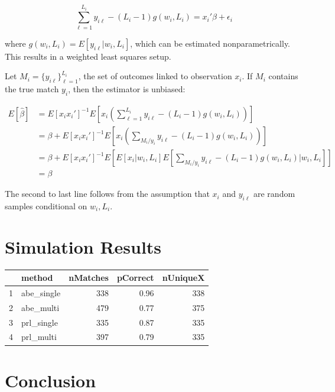 \documentclass[12pt]{article}
\begin{document}
\begin{equation} 
\sum_{\ell=1}^{L_i} y_{i\ell} - (L_i - 1)g(w_i, L_i) = x_i'\beta + \epsilon_i \end{equation}

\noindent where $g(w_i, L_i) = E[y_{i\ell} | w_i, L_i ]$, which can be estimated nonparametrically.   This results in a weighted least squares setup.  

Let $M_i = \{y_{i\ell}\}_{\ell=1}^{L_i}$, the set of outcomes linked to observation $x_i$.  If $M_i$ contains the true match $y_i$,  then the estimator is unbiased:  

\begin{align*} E[\hat{\beta}] &= E[x_ix_i']^{-1}E\left[x_i\left( \sum_{\ell = 1}^{L_i} y_{i\ell}- (L_i-1)g(w_i,L_i) \right) \right] \\
&=\beta + E[x_ix_i']^{-1} E\left[ x_i \left(\sum_{M_i / y_i} y_{i\ell} - (L_i -1) g(w_i, L_i)\right)\right] \\ 
&= \beta +  E[x_ix_i']^{-1} E\left[ E[x_i |w_i, L_i] E\left[\sum_{M_i / y_i} y_{i\ell} - (L_i -1) g(w_i, L_i) | w_i, L_i \right] \right]  \\
&= \beta \end{align*} 

The second to last line follows from the assumption that $x_i$ and $y_{i\ell}$ are random samples conditional on $w_i, L_i$.  

\section{Simulation Results}

\begin{table}[ht]
\centering
\begin{tabular}{rlrrr}
  \hline
 & method & nMatches & pCorrect & nUniqueX \\ 
  \hline
1 & abe\_single & 338 & 0.96 & 338 \\ 
  2 & abe\_multi & 479 & 0.77 & 375 \\ 
  3 & prl\_single & 335 & 0.87 & 335 \\ 
  4 & prl\_multi & 397 & 0.79 & 335 \\ 
   \hline
\end{tabular}
\end{table}

\section{Conclusion}

\newpage
\singlespacing
 

\end{document}

